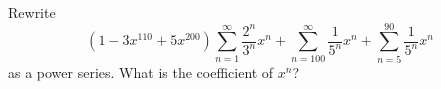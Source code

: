 Rewrite 
\[
(1 - 3x^{110} + 5x^{200}) \sum_{n = 1}^\infty \frac{2^n}{3^n}x^n
+ \sum_{n=100}^\infty \frac{1}{5^n}x^n
+ \sum_{n=5}^{90} \frac{1}{5^n}x^n 
\] as a
power series.
What is the coefficient of $x^n$?
